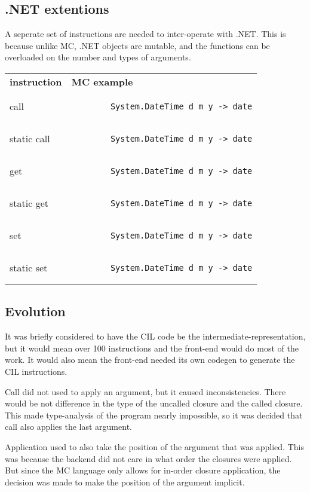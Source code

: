 \subsection{.NET extentions}
A seperate set of instructions are needed to inter-operate with .NET.
This is because unlike MC, .NET objects are mutable, and the functions can be overloaded on the number and types of arguments.

\begin{tabular}{ll}
    \textbf{instruction} & \textbf{MC example}\\
    call & \begin{lstlisting}
        System.DateTime d m y -> date
    \end{lstlisting}\\
    static call & \begin{lstlisting}
        System.DateTime d m y -> date
    \end{lstlisting}\\
    get & \begin{lstlisting}
        System.DateTime d m y -> date
    \end{lstlisting}\\
    static get & \begin{lstlisting}
        System.DateTime d m y -> date
    \end{lstlisting}\\
    set & \begin{lstlisting}
        System.DateTime d m y -> date
    \end{lstlisting}\\
    static set & \begin{lstlisting}
        System.DateTime d m y -> date
    \end{lstlisting}\\
\end{tabular}

\subsection{Evolution}
It was briefly considered to have the CIL code be the intermediate-representation, but it would mean over 100 instructions and the front-end would do most of the work.
It would also mean the front-end needed its own codegen to generate the CIL instructions.

Call did not used to apply an argument, but it caused inconsistencies.
There would be not difference in the type of the uncalled closure and the called closure.
This made type-analysis of the program nearly impossible, so it was decided that call also applies the last argument.

Application used to also take the position of the argument that was applied.
This was because the backend did not care in what order the closures were applied.
But since the MC language only allows for in-order closure application, the decision was made to make the position of the argument implicit.

